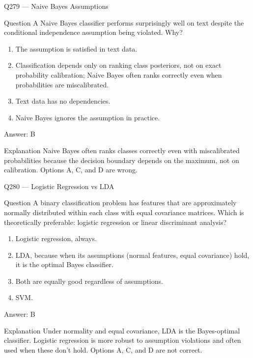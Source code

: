 \documentclass[aspectratio=169,8pt]{beamer}
\begin{document}
\begin{frame}{Q279 --- Naive Bayes Assumptions}
\begin{block}{Question}
A Naive Bayes classifier performs surprisingly well on text despite the conditional independence assumption being violated. Why?
\begin{enumerate}
\item The assumption is satisfied in text data.
\item Classification depends only on ranking class posteriors, not on exact probability calibration; Naive Bayes often ranks correctly even when probabilities are miscalibrated.
\item Text data has no dependencies.
\item Naive Bayes ignores the assumption in practice.
\end{enumerate}\end{block}
\begin{exampleblock}{Answer: B}\end{exampleblock}
\begin{block}{Explanation}
Naive Bayes often ranks classes correctly even with miscalibrated probabilities because the decision boundary depends on the maximum, not on calibration. Options A, C, and D are wrong.
\end{block}
\end{frame}

\begin{frame}{Q280 --- Logistic Regression vs LDA}
\begin{block}{Question}
A binary classification problem has features that are approximately normally distributed within each class with equal covariance matrices. Which is theoretically preferable: logistic regression or linear discriminant analysis?
\end{block}
\begin{enumerate}
\item Logistic regression, always.
\item LDA, because when its assumptions (normal features, equal covariance) hold, it is the optimal Bayes classifier.
\item Both are equally good regardless of assumptions.
\item SVM.
\end{enumerate}
\begin{exampleblock}{Answer: B}\end{exampleblock}
\begin{block}{Explanation}
Under normality and equal covariance, LDA is the Bayes-optimal classifier. Logistic regression is more robust to assumption violations and often used when these don't hold. Options A, C, and D are not correct.
\end{block}
\end{frame}
\end{document}
